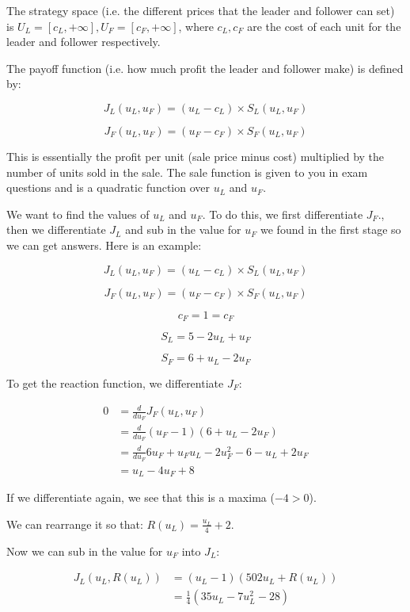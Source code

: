 The strategy space (i.e. the different prices that the leader and follower can
set) is $U_L = [c_L, +\infty], U_F = [c_F, +\infty]$, where $c_L, c_F$ are the
cost of each unit for the leader and follower respectively.

The payoff function (i.e. how much profit the leader and follower make) is
defined by:

\[
  J_L(u_L, u_F) = (u_L - c_L) \times S_L(u_L, u_F)
\]

\[
  J_F(u_L, u_F) = (u_F - c_F) \times S_F(u_L, u_F)
\]

This is essentially the profit per unit (sale price minus cost) multiplied by
the number of units sold in the sale. The sale function is given to you in exam
questions and is a quadratic function over $u_L$ and $u_F$.

We want to find the values of $u_L$ and $u_F$. To do this, we first
differentiate $J_F$., then we differentiate $J_L$ and sub in the value for $u_F$
we found in the first stage so we can get answers. Here is an example:

\[
  J_L(u_L, u_F) = (u_L - c_L) \times S_L(u_L, u_F)
\]

\[
  J_F(u_L, u_F) = (u_F - c_F) \times S_F(u_L, u_F)
\]

\[
  c_F = 1 = c_F
\]

\[
  S_L =  5 - 2u_L + u_F
\]

\[
  S_F = 6 + u_L - 2u_F
\]

To get the reaction function, we differentiate $J_F$:

\[
  \begin{split}
    0 &= \frac{d}{du_F}J_F(u_L,u_F)\\
      &= \frac{d}{du_F}(u_F - 1)(6 + u_L - 2u_F)\\
      &= \frac{d}{du_F}6u_F + u_Fu_L - 2u_F^2 - 6 - u_L + 2u_F\\
      &= u_L - 4u_F + 8
  \end{split}
\]

If we differentiate again, we see that this is a maxima ($-4 > 0$).

We can rearrange it so that: $R(u_L) = \frac{u_L}{4} + 2$.

Now we can sub in the value for $u_F$ into $J_L$:

\[
  \begin{split}
    J_L(u_L, R(u_L)) &= (u_L - 1)(5 0 2u_L + R(u_L))\\
                     &= \frac{1}{4}(35u_L - 7u_L^2 - 28)
  \end{split}
\]

